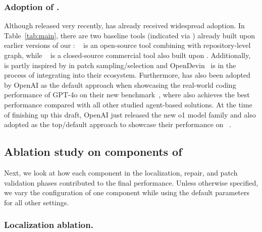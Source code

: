 \subsubsection{Adoption of \tech.} 
Although released very recently, \tech has already received widespread adoption. 
In Table~\ref{tab:main}, there are two baseline tools (indicated via \cat) already built upon earlier versions of our \tech:
\repograph~\cite{repograph} is an open-source tool combining \tech with repository-level graph, while \isoform{}~\cite{isoform} is a closed-source commercial tool also built upon \tech. 
Additionally, \bytedanceagent~\cite{marscode} is partly inspired by \tech in patch sampling/selection and OpenDevin~\cite{opendevin} is in the process of integrating \tech into their ecosystem. 
Furthermore, \tech has also been adopted by OpenAI as the default approach when showcasing the real-world coding performance of GPT-4o on their new \swebenchverified benchmark~\cite{openaiverified}, where \tech also achieves the best performance compared with all other studied agent-based solutions.
At the time of finishing up this draft, OpenAI just released the new o1 model family and also adopted \tech as the top/default approach to showcase their performance on \swebench~\cite{openaioonesystemcard}.%

\subsection{Ablation study on components of \tech} 

Next, we look at how each component in the localization, repair, and patch validation phases contributed to the final \tech performance. 
Unless otherwise specified, we vary the configuration of one component while using the default parameters for all other settings. 

\subsubsection{Localization ablation.}

